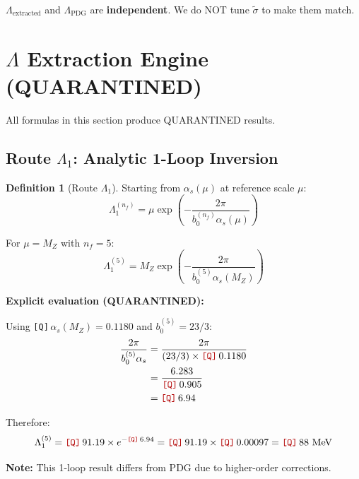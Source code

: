 \documentclass[11pt,a4paper]{article}
\newcommand{\Qnum}[1]{\textcolor{red!70!black}{\texttt{[Q]}}\,#1}
\theoremstyle{definition}
\newtheorem{definition}{Definition}[section]
\begin{document}
\begin{nofitbox}
$\Lambda_{\text{extracted}}$ and $\Lambda_{\text{PDG}}$ are \textbf{independent}.
We do NOT tune $\tilde{\sigma}$ to make them match.
\end{nofitbox}

\section{$\Lambda$ Extraction Engine (QUARANTINED)}
\label{sec:lambda-engine}

\begin{quarantinebox}
All formulas in this section produce QUARANTINED results.
\end{quarantinebox}

\subsection{Route $\Lambda_1$: Analytic 1-Loop Inversion}
\label{subsec:route-lambda1}

\begin{definition}[Route $\Lambda_1$]
\label{def:route-lambda1}
Starting from $\alpha_s(\mu)$ at reference scale $\mu$:
\begin{equation}
\label{eq:lambda1-formula}
\boxed{\Lambda_1^{(n_f)} = \mu \exp\left(-\frac{2\pi}{b_0^{(n_f)} \alpha_s(\mu)}\right)}
\end{equation}

For $\mu = M_Z$ with $n_f = 5$:
\begin{equation}
\label{eq:lambda1-at-mz}
\Lambda_1^{(5)} = M_Z \exp\left(-\frac{2\pi}{b_0^{(5)} \alpha_s(M_Z)}\right)
\end{equation}
\end{definition}

\textbf{Explicit evaluation (QUARANTINED):}
\begin{quarantinebox}
Using \Qnum{$\alpha_s(M_Z) = 0.1180$} and $b_0^{(5)} = 23/3$:
\begin{align}
\label{eq:lambda1-step1}
\frac{2\pi}{b_0^{(5)} \alpha_s} &= \frac{2\pi}{(23/3) \times \Qnum{0.1180}} \\
\label{eq:lambda1-step2}
&= \frac{6.283}{\Qnum{0.905}} \\
\label{eq:lambda1-step3}
&= \Qnum{6.94}
\end{align}

Therefore:
\begin{equation}
\label{eq:lambda1-result}
\Lambda_1^{(5)} = \Qnum{91.19} \times e^{-\Qnum{6.94}}
  = \Qnum{91.19} \times \Qnum{0.00097} = \Qnum{88} \text{ MeV}
\end{equation}

\textbf{Note:} This 1-loop result differs from PDG due to higher-order corrections.
\end{quarantinebox}
\end{document}
